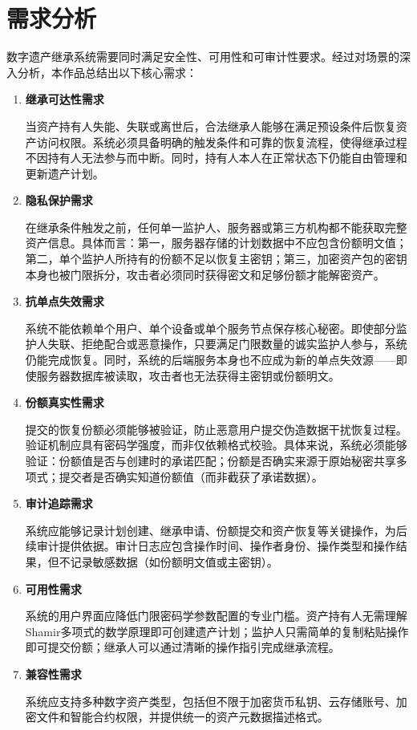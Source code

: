 \documentclass[UTF8,a4paper,zihao=-4,openany]{ctexrep}
\begin{document}
\section{需求分析}

数字遗产继承系统需要同时满足安全性、可用性和可审计性要求。经过对场景的深入分析，本作品总结出以下核心需求：

\begin{enumerate}
  \item \textbf{继承可达性需求}

  当资产持有人失能、失联或离世后，合法继承人能够在满足预设条件后恢复资产访问权限。系统必须具备明确的触发条件和可靠的恢复流程，使得继承过程不因持有人无法参与而中断。同时，持有人本人在正常状态下仍能自由管理和更新遗产计划。

  \item \textbf{隐私保护需求}

  在继承条件触发之前，任何单一监护人、服务器或第三方机构都不能获取完整资产信息。具体而言：第一，服务器存储的计划数据中不应包含份额明文值；第二，单个监护人所持有的份额不足以恢复主密钥；第三，加密资产包的密钥本身也被门限拆分，攻击者必须同时获得密文和足够份额才能解密资产。

  \item \textbf{抗单点失效需求}

  系统不能依赖单个用户、单个设备或单个服务节点保存核心秘密。即使部分监护人失联、拒绝配合或恶意操作，只要满足门限数量的诚实监护人参与，系统仍能完成恢复。同时，系统的后端服务本身也不应成为新的单点失效源——即使服务器数据库被读取，攻击者也无法获得主密钥或份额明文。

  \item \textbf{份额真实性需求}

  提交的恢复份额必须能够被验证，防止恶意用户提交伪造数据干扰恢复过程。验证机制应具有密码学强度，而非仅依赖格式校验。具体来说，系统必须能够验证：份额值是否与创建时的承诺匹配；份额是否确实来源于原始秘密共享多项式；提交者是否确实知道份额值（而非截获了承诺数据）。

  \item \textbf{审计追踪需求}

  系统应能够记录计划创建、继承申请、份额提交和资产恢复等关键操作，为后续审计提供依据。审计日志应包含操作时间、操作者身份、操作类型和操作结果，但不记录敏感数据（如份额明文值或主密钥）。

  \item \textbf{可用性需求}

  系统的用户界面应降低门限密码学参数配置的专业门槛。资产持有人无需理解Shamir多项式的数学原理即可创建遗产计划；监护人只需简单的复制粘贴操作即可提交份额；继承人可以通过清晰的操作指引完成继承流程。

  \item \textbf{兼容性需求}

  系统应支持多种数字资产类型，包括但不限于加密货币私钥、云存储账号、加密文件和智能合约权限，并提供统一的资产元数据描述格式。

\end{enumerate}
\end{document}
